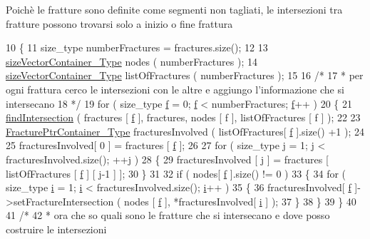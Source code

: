 Poichè le fratture sono definite come segmenti non tagliati, le intersezioni tra fratture possono trovarsi solo a inizio o fine frattura 
\begin{DoxyCode}
10 \{
11     size\_type numberFractures = fractures.size();
12 
13     \hyperlink{Core_8h_a80e8381d86ecb0a7f4f87ff84d1a0be5}{sizeVectorContainer\_Type} nodes ( numberFractures );
14     \hyperlink{Core_8h_a80e8381d86ecb0a7f4f87ff84d1a0be5}{sizeVectorContainer\_Type} listOfFractures ( numberFractures );
15 
16     \textcolor{comment}{/*}
17 \textcolor{comment}{     * per ogni frattura cerco le intersezioni con le altre e aggiungo l'informazione che si intersecano}
18 \textcolor{comment}{     */}
19     \textcolor{keywordflow}{for} ( size\_type \hyperlink{god__e_8m_a68f477f9b30a6300d5af9b02eac82f35}{f} = 0; \hyperlink{god__e_8m_a68f477f9b30a6300d5af9b02eac82f35}{f} < numberFractures; \hyperlink{god__e_8m_a68f477f9b30a6300d5af9b02eac82f35}{f}++ )
20     \{
21         \hyperlink{classFractureIntersect_a63e99fbb20ef4804cbf99d8f1ab19ac6}{findIntersection} ( fractures [ \hyperlink{god__e_8m_a68f477f9b30a6300d5af9b02eac82f35}{f} ], fractures, nodes [ f ],  listOfFractures [ f ]
       );
22 
23         \hyperlink{FractureHandler_8h_a2f0b57e18ecf89912d7de0c87158009e}{FracturePtrContainer\_Type} fracturesInvolved ( listOfFractures[ 
      \hyperlink{god__e_8m_a68f477f9b30a6300d5af9b02eac82f35}{f} ].size() +1 );
24 
25         fracturesInvolved[ 0 ] = fractures [ \hyperlink{god__e_8m_a68f477f9b30a6300d5af9b02eac82f35}{f} ];
26 
27         \textcolor{keywordflow}{for} ( size\_type j = 1; j < fracturesInvolved.size(); ++j )
28         \{
29              fracturesInvolved [ j ] = fractures [ listOfFractures [ \hyperlink{god__e_8m_a68f477f9b30a6300d5af9b02eac82f35}{f} ] [ j-1 ] ];
30         \}
31 
32         \textcolor{keywordflow}{if} ( nodes[ \hyperlink{god__e_8m_a68f477f9b30a6300d5af9b02eac82f35}{f} ].size() != 0 )
33         \{
34             \textcolor{keywordflow}{for} ( size\_type \hyperlink{god__e_8m_a8604be5925f4266ab5ccc69675329c80}{i} = 1; \hyperlink{god__e_8m_a8604be5925f4266ab5ccc69675329c80}{i} < fracturesInvolved.size(); \hyperlink{god__e_8m_a8604be5925f4266ab5ccc69675329c80}{i}++ )
35             \{
36                 fracturesInvolved[ \hyperlink{god__e_8m_a68f477f9b30a6300d5af9b02eac82f35}{f} ]->setFractureIntersection ( nodes [ \hyperlink{god__e_8m_a68f477f9b30a6300d5af9b02eac82f35}{f} ], *fracturesInvolved[ 
      \hyperlink{god__e_8m_a8604be5925f4266ab5ccc69675329c80}{i} ] );
37             \}
38         \}
39     \}
40 
41     \textcolor{comment}{/*}
42 \textcolor{comment}{     * ora che so quali sono le fratture che si intersecano e dove posso costruire le intersezioni}

\end{DoxyCode}
